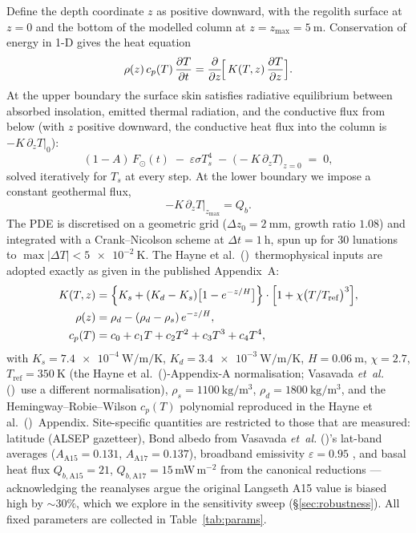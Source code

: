 \documentclass[11pt]{article}
\newcommand{\Hayne}{Hayne et al.\ (\citeyear{hayne2017})}
\newcommand{\Vas}{Vasavada \emph{et~al.} (\citeyear{vasavada2012})}
\begin{document}
Define the depth coordinate $z$ as positive downward, with the
regolith surface at $z=0$ and the bottom of the modelled column at
$z=z_\mathrm{max}=\SI{5}{\meter}$. Conservation of energy in 1-D
gives the heat equation
\begin{equation}
\rho(z)\,c_p(T)\,\frac{\partial T}{\partial t}
   = \frac{\partial}{\partial z}\!\Bigl[\,K(T,z)\,\frac{\partial T}{\partial z}\Bigr].
\label{eq:heat}
\end{equation}
At the upper boundary the surface skin satisfies radiative
equilibrium between absorbed insolation, emitted thermal radiation,
and the conductive flux from below (with $z$ positive downward, the
conductive heat flux into the column is
$-K\,\partial_z T|_{0}$):
\begin{equation}
(1-A)\,F_\odot(t)\;-\;\varepsilon\sigma T_s^4
\;-\;\bigl(-K\,\partial_z T\bigr)_{\!z=0} \;=\; 0,
\label{eq:bc-top}
\end{equation}
solved iteratively for $T_s$ at every step. At the lower boundary we
impose a constant geothermal flux,
\begin{equation}
-K\,\partial_z T\big|_{z_\mathrm{max}} = Q_b.
\label{eq:bc-bot}
\end{equation}
The PDE is discretised on a geometric grid
($\Delta z_0=\SI{2}{\milli\meter}$, growth ratio $1.08$) and integrated
with a Crank--Nicolson scheme at $\Delta t = \SI{1}{\hour}$, spun up
for 30 lunations to $\max|\Delta T|<\SI{5e-2}{\kelvin}$.
The \Hayne\ thermophysical inputs are adopted exactly as given in
the published Appendix~A:
\begin{align}
K(T,z) &= \Bigl\{K_s + (K_d-K_s)\bigl[1-e^{-z/H}\bigr]\Bigr\}
         \cdot\Bigl[1 + \chi\bigl(T/T_\mathrm{ref}\bigr)^3\Bigr], \label{eq:K} \\
\rho(z) &= \rho_d - (\rho_d-\rho_s)\,e^{-z/H}, \label{eq:rho}\\
c_p(T)  &= c_0 + c_1 T + c_2 T^2 + c_3 T^3 + c_4 T^4, \label{eq:cp}
\end{align}
with $K_s=\SI{7.4e-4}{\watt\per\meter\per\kelvin}$,
$K_d=\SI{3.4e-3}{\watt\per\meter\per\kelvin}$, $H=\SI{0.06}{\meter}$,
$\chi=2.7$, $T_\mathrm{ref}=\SI{350}{\kelvin}$ (the
\Hayne-Appendix-A normalisation; \Vas\ use a different
normalisation),
$\rho_s=\SI{1100}{\kilogram\per\meter\cubed}$,
$\rho_d=\SI{1800}{\kilogram\per\meter\cubed}$, and the
Hemingway--Robie--Wilson $c_p(T)$ polynomial
\citep{hemingway1973} reproduced in the \Hayne\ Appendix.
Site-specific quantities are restricted to those that are
measured: latitude (ALSEP gazetteer), Bond albedo from
\Vas's lat-band averages
($A_\mathrm{A15}=0.131$, $A_\mathrm{A17}=0.137$), broadband
emissivity $\varepsilon=0.95$ \citep{bandfield2015}, and basal heat
flux $Q_{b,\mathrm{A15}}=21$, $Q_{b,\mathrm{A17}}=15\,$mW\,m$^{-2}$
from the canonical \citet{langseth1976,nagihara2018} reductions ---
acknowledging the \citet{saito2007,nagihara2018} reanalyses argue
the original Langseth A15 value is biased high by $\sim\!30\%$,
which we explore in the sensitivity sweep (\S\ref{sec:robustness}).
All fixed parameters are collected in Table~\ref{tab:params}.
\end{document}
